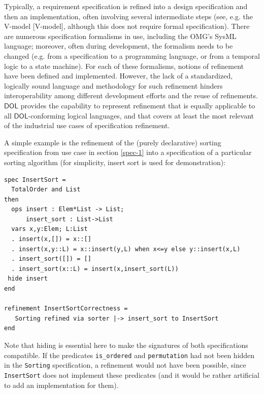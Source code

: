\documentclass[10pt,fleqn,final]{scrreprt}
\newcommand*{\DOL}{\ensuremath{\mathsf{DOL}}\xspace}
\newenvironment{definitions}[0]{\medskip }{}
\begin{document}
\begin{definitions}
Typically, a requirement specification is refined into a
design specification and then an implementation, often involving
several intermediate steps (see, e.g. the V-model [V-model], although
this does not require formal specification).  There are numerous
specification formalisms in use, including the OMG's SysML language;
moreover, often during development, the formalism needs to be changed
(e.g. from a specification to a programming language, or from a
temporal logic to a state machine). For each of these formalisms,
notions of refinement have been defined and implemented. However, the
lack of a standardized, logically sound language and methodology for
such refinement hinders interoperability among different development
efforts and the reuse of refinements.  \DOL provides the capability to
represent refinement that is equally applicable to all \DOL-conforming
logical languages, and that covers at least the most relevant of the
industrial use cases of specification refinement.

A simple example is the refinement of the (purely declarative) sorting
specification from use case in section \ref{spec-1} into a specification of a particular sorting
algorithm (for simplicity, insert sort is used for demonstration):

\begin{lstlisting}[basicstyle=\ttfamily\footnotesize,language=dolText,morekeywords={sort, ops, refinement, free,spec type, assoc, unit,props,op,spec,refined, via,generated, then,ObjectProperty,Class,DisjointUnionOf,SubClassOf,Characteristics,Transitive,Asymmetric,SubPropertyOf,DisjointClasses,EquivalentTo,inverse,only,forall,iff,if,or,exists,distributed,from},escapechar=@,mathescape]	
spec InsertSort = 
  TotalOrder and List
then
  ops insert : Elem*List -> List;
      insert_sort : List->List
  vars x,y:Elem; L:List
  . insert(x,[]) = x::[]
  . insert(x,y::L) = x::insert(y,L) when x<=y else y::insert(x,L)
  . insert_sort([]) = []
  . insert_sort(x::L) = insert(x,insert_sort(L))
 hide insert
end

refinement InsertSortCorrectness =
   Sorting refined via sorter |-> insert_sort to InsertSort
end
\end{lstlisting}
Note that hiding is essential here to make the signatures of
both specifications compatible. If  the
predicates \texttt{is\_ordered} and \texttt{permutation}
had not been hidden in the \texttt{Sorting} specification, a refinement would
not have been possible, since \texttt{InsertSort} does not
implement these predicates (and it would be rather artificial
to add an implementation for them).


\end{definitions}
\end{document}
